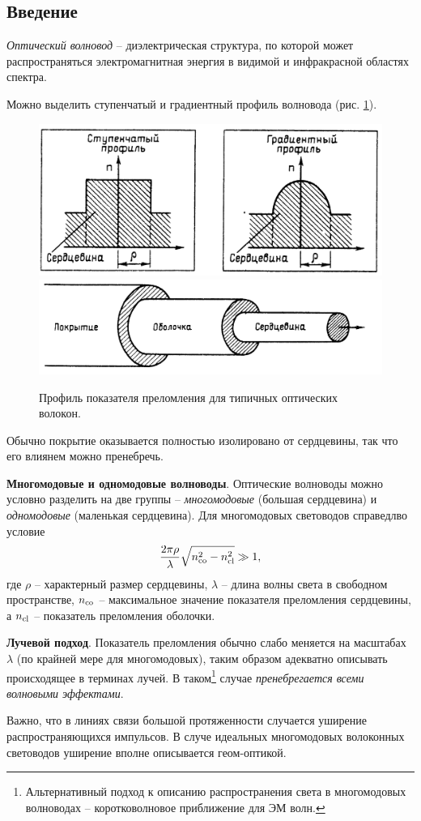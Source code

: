 
\subsection{Введение}


\begin{to_def}
    \textit{Оптический волновод} -- диэлектрическая структура, по которой может распространяться электромагнитная энергия в видимой и инфракрасной областях спектра. 
\end{to_def}

Можно выделить ступенчатый и градиентный профиль волновода (рис. \ref{waveguide}).
\begin{figure}[ht]
    \centering
    \includegraphics[height=0.17\textwidth]{figures/13_1.png}
    \hspace{5 mm} 
    \includegraphics[height=0.12\textwidth]{figures/13_2.png}
    \caption{Профиль показателя преломления для типичных оптических волокон.}
    \label{waveguide}
\end{figure}
Обычно покрытие оказывается полностью изолировано от сердцевины, так что его влиянем можно пренебречь. 


\textbf{Многомодовые и одномодовые волноводы}. Оптические волноводы можно условно разделить на две группы -- \textit{многомодовые} (большая сердцевина) и \textit{одномодовые} (маленькая сердцевина). Для многомодовых световодов справедлво условие
\begin{equation*}
    \frac{2\pi \rho}{\lambda} \sqrt{n_{\textnormal{co}}^2 - n_{\textnormal{cl}}^2} \gg 1,
\end{equation*}
где $\rho$ -- характерный размер сердцевины, $\lambda$ -- длина волны света в свободном пространстве, $n_{\textnormal{co}}$ -- максимальное значение показателя преломления сердцевины, а $n_{\textnormal{cl}}$ -- показатель преломления оболочки. 

\textbf{Лучевой подход}. Показатель преломления обычно слабо меняется на масштабах $\lambda$ (по крайней мере для многомодовых), таким образом адекватно описывать происходящее в терминах лучей. 
В таком\footnote{
    Альтернативный подход к описанию распространения света в многомодовых волноводах -- коротковолновое приближение для ЭМ волн. 
}  случае \textit{пренебрегается всеми волновыми эффектами}. 


Важно, что в линиях связи большой протяженности случается уширение распространяющихся импульсов. В случе идеальных многомодовых волоконных световодов уширение вполне описывается геом-оптикой. 


